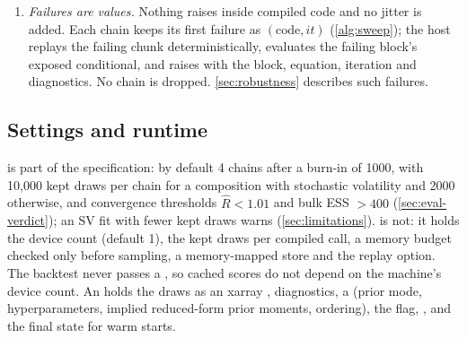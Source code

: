 \begin{enumerate}[leftmargin=*,itemsep=2pt,topsep=4pt]
    counters and no key in any loop carry, so a draw depends on its position in the chain, not on how
    sweeps are grouped into compiled calls. %
  \item \emph{Failures are values.} Nothing raises inside compiled code and no jitter is added. Each
    chain keeps its first failure as $(\text{code}, it)$ (\cref{alg:sweep}); the host replays the failing chunk deterministically, evaluates the failing
    block's exposed conditional, and raises  with the block, equation,
    iteration and diagnostics. No chain is dropped. %
    \cref{sec:robustness} describes such failures.
\end{enumerate}

\subsection{Settings and runtime}\label{sec:arch-settings}

 is part of the specification: by default 4 chains after a burn-in of 1000, with
10,000 kept draws per chain for a composition with stochastic volatility and 2000 otherwise, and
convergence thresholds $\hat R < 1.01$ and bulk ESS $> 400$ (\cref{sec:eval-verdict}); an SV fit with
fewer kept draws warns (\cref{sec:limitations}). %
 is not: it holds the device count (default 1), the kept draws per compiled call, a memory
budget checked only before sampling, a memory-mapped store and the replay option. %
The backtest never passes a , so cached scores do not depend on the machine's device
count. %
An  holds the draws as an xarray  \citep{hoyer2017xarray}, diagnostics,
a  (prior mode, hyperparameters, implied reduced-form prior moments, ordering), the
 flag, ,  and the final state for warm starts.

